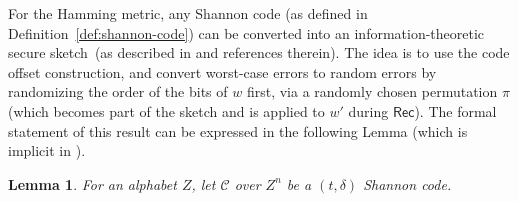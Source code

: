 \documentclass[11pt]{article}
\newcommand{\class}[1]{{\ensuremath{\mathsf{#1}}}}
\newcommand{\sketch}{\ensuremath{\class{SS}}\xspace}
\newcommand{\rec}{\ensuremath{\class{Rec}}\xspace}
\newcommand{\Hoo}{\mathrm{H}_\infty}
\newtheorem{lemma}[theorem]{Lemma}
\newcommand{\authnote}[2]{{\textcolor{red}{\textsf{#1 notes: }\textcolor{blue}{ #2}}\marginpar{\textcolor{red}{\textbf{!!!!!}}}}}
\newcommand{\authnote}[2]{}
\newcommand{\lnote}[1]{{\authnote{Leo}{#1}}}
\begin{document}
For the Hamming metric, any Shannon code (as defined in Definition~\ref{def:shannon-code}) can be converted into an information-theoretic secure sketch~(as described in \cite[Section 8.2]{DBLP:journals/siamcomp/DodisORS08} and references therein).  The idea is to use the code offset construction, and convert worst-case errors to random errors by randomizing the order of the bits of $w$ first, via a randomly chosen  permutation $\pi$  (which  becomes part of the sketch and is applied to $w'$ during $\rec$). The formal statement of this result  can be expressed in the following Lemma (which is implicit in \cite[Section 8.2]{DBLP:journals/siamcomp/DodisORS08}).
\begin{lemma}
\label{lem:shannon to sketch}
For an alphabet $Z$, let $\mathcal{C}$ over $Z^n$ be a $(t, \delta)$ Shannon code.  %
%

\end{lemma}
\end{document}
